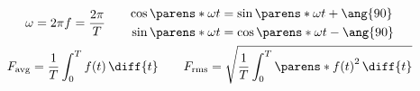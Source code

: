 \begin{multicols}{2}
\begin{CheatsheetEntryFrame}
\begin{center}
        \end{center}

    \end{CheatsheetEntryFrame}

    \begin{CheatsheetEntryFrameExn}

        \begin{gather*}
            \omega = 2 \pi f = \frac{2 \pi}{T}
            \qquad
            \begin{aligned}
                \cos{\parens*{\omega t}} &= \sin{\parens*{\omega t + \ang{90}}} \\
                \sin{\parens*{\omega t}} &= \cos{\parens*{\omega t - \ang{90}}}
            \end{aligned}
            \\
            F_{\text{avg}} = \frac{1}{T} \int_0^T{f(t) \,\diff{t}}
            \qquad
            F_{\text{rms}} = \sqrt{\frac{1}{T} \int_0^T{\parens*{f(t)}^2 \,\diff{t}}}
        \end{gather*}%

    \end{CheatsheetEntryFrameExn}


    \begin{CheatsheetEntryFrame}

        \newcommand{\MinipagesThreeColumns}[3]{
            \begin{minipage}[c]{0.33\columnwidth}%
                \centering
                #1
            \end{minipage}%
            \begin{minipage}[c]{0.33\columnwidth}%
                \centering
                #2
            \end{minipage}%
            \begin{minipage}[c]{0.33\columnwidth}%
                \centering
                #3
            \end{minipage}%
        }


\end{CheatsheetEntryFrame}
\end{multicols}
